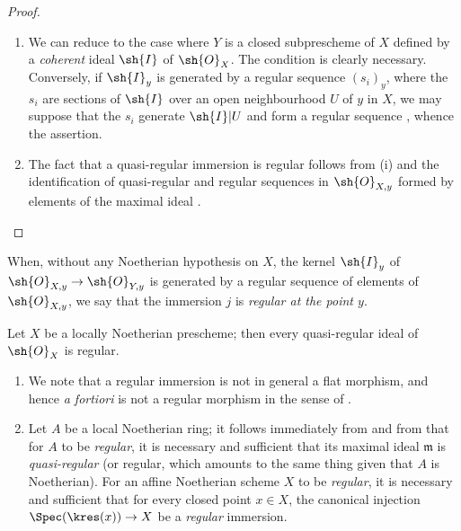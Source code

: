 \begin{proof}
  \begin{enumerate}
    \item[\rm{(i)}] We can reduce to the case where $Y$ is a closed subprescheme of $X$ defined by a \emph{coherent} ideal $\sh{I}$ of $\sh{O}_X$.
    The condition is clearly necessary.
    Conversely, if $\sh{I}_y$ is generated by a regular sequence $(s_i)_y$, where the $s_i$ are sections of $\sh{I}$ over an open neighbourhood $U$ of $y$ in $X$, we may suppose that the $s_i$ generate $\sh{I}|U$  and form a regular sequence , whence the assertion.
    \item[\rm{(ii)}] The fact that a quasi-regular immersion is regular follows from (i) and the identification of quasi-regular and regular sequences in $\sh{O}_{X,y}$ formed by elements of the maximal ideal .
  \end{enumerate}
\end{proof}

When, without any Noetherian hypothesis on $X$, the kernel $\sh{I}_y$ of $\sh{O}_{X,y} \to \sh{O}_{Y,y}$ is generated by a regular sequence of elements of $\sh{O}_{X,y}$, we say that the immersion $j$ is \emph{regular at the point $y$}.

\begin{corollary}[16.9.11]
\label{IV.16.9.11}
Let $X$ be a locally Noetherian prescheme;
then every quasi-regular ideal of $\sh{O}_X$ is regular.
\end{corollary}

\begin{remarks}[16.9.12]
\label{IV.16.9.12}
\begin{enumerate}
  \item[\rm{(i)}] We note that a regular immersion is not in general a flat morphism, and hence \textit{a fortiori} is not a regular morphism in the sense of .
  \item[\rm{(ii)}] Let $A$ be a local Noetherian ring;
  it follows immediately from  and from  that for $A$ to be \emph{regular}, it is necessary and sufficient that its maximal ideal $\mathfrak{m}$ is \emph{quasi-regular} (or regular, which amounts to the same thing given that $A$ is Noetherian).
  For an affine Noetherian scheme $X$ to be \emph{regular}, it is necessary and sufficient that for every closed point $x \in X$, the canonical injection $\Spec(\kres(x)) \to X$ be a \emph{regular} immersion.
\end{enumerate}
\end{remarks}

